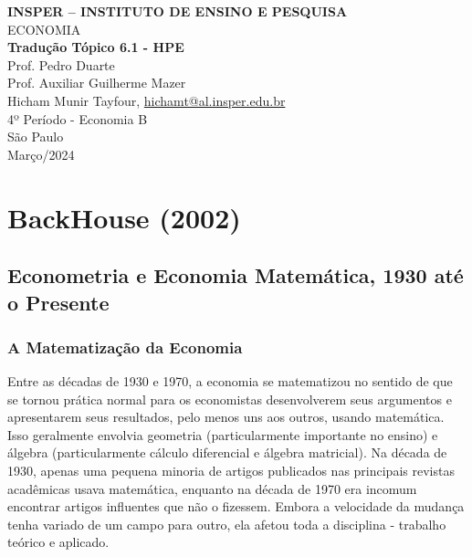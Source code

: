 \documentclass[12pt]{article}
\begin{document}
\begin{titlepage}
    \centering
    \vspace*{1cm}
    \Large\textbf{INSPER – INSTITUTO DE ENSINO E PESQUISA}\\
    \Large ECONOMIA\\
    \vspace{1.5cm}
    \Large\textbf{Tradução Tópico 6.1 - HPE}\\
    \vspace{1.5cm}
    Prof. Pedro Duarte\\
    Prof. Auxiliar Guilherme Mazer\\
    \vfill
    \normalsize
    Hicham Munir Tayfour, \href{mailto:hichamt@al.insper.edu.br}{hichamt@al.insper.edu.br}\\
    4º Período - Economia B\\
    \vfill
    São Paulo\\
    Março/2024
\end{titlepage}

\newpage
\tableofcontents
\thispagestyle{empty} %
\newpage
\setcounter{page}{1} %
\justify
\onehalfspacing

\pagestyle{fancy}
\fancyhf{}
\rhead{\thepage}

\section{\textbf{BackHouse (2002)}}
\subsection{\textbf{Econometria e Economia Matemática, 1930 até o Presente}}
\subsubsection{\textbf{A Matematização da Economia}}

Entre as décadas de 1930 e 1970, a economia se matematizou no sentido de que se tornou prática normal para os economistas desenvolverem seus argumentos e apresentarem seus resultados, pelo menos uns aos outros, usando matemática. Isso geralmente envolvia geometria (particularmente importante no ensino) e álgebra (particularmente cálculo diferencial e álgebra matricial). Na década de 1930, apenas uma pequena minoria de artigos publicados nas principais revistas acadêmicas usava matemática, enquanto na década de 1970 era incomum encontrar artigos influentes que não o fizessem. Embora a velocidade da mudança tenha variado de um campo para outro, ela afetou toda a disciplina - trabalho teórico e aplicado.
\end{document}
